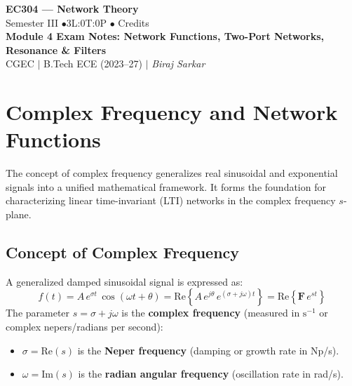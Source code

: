 \documentclass[12pt,a4paper]{article}
\begin{document}
\begin{center}
  {\LARGE\bfseries\color{myred} EC304 --- Network Theory}\\[5pt]
  {\normalsize\color{mydark} Semester III \quad$\bullet$\quad 3L:0T:0P \quad$\bullet$ Credits}\\[3pt]
  {\normalsize\color{myteal}\textbf{Module 4 Exam Notes: Network Functions, Two-Port Networks, Resonance \& Filters}}\\[3pt]
  {\small\color{mydark} CGEC \;$|$\; B.Tech ECE (2023--27) \;$|$\; \textit{Biraj Sarkar}}
\end{center}
\vspace{2pt}\noindent{\color{myred}\rule{\linewidth}{1.5pt}}\vspace{2pt}

\hypersetup{linkcolor=mydark}
\tableofcontents
\hypersetup{linkcolor=myteal}
\newpage

\section{Complex Frequency and Network Functions}

The concept of complex frequency generalizes real sinusoidal and exponential signals into a unified mathematical framework. It forms the foundation for characterizing linear time-invariant (LTI) networks in the complex frequency $s$-plane.

\subsection{Concept of Complex Frequency}

\begin{tcolorbox}[defbox, title={\textbf{Definition of Complex Frequency}}]
A generalized damped sinusoidal signal is expressed as:
\begin{equation}
  f(t) = A\,e^{\sigma t}\,\cos(\omega t + \theta) = \text{Re}\left\{ A\,e^{j\theta}\,e^{(\sigma + j\omega)t} \right\} = \text{Re}\left\{ \mathbf{F}\,e^{st} \right\}
\end{equation}
The parameter $s = \sigma + j\omega$ is the \textbf{complex frequency} (measured in $\text{s}^{-1}$ or complex nepers/radians per second):
\begin{itemize}[leftmargin=*]
  \item $\sigma = \text{Re}(s)$ is the \textbf{Neper frequency} (damping or growth rate in Np/s).
  \item $\omega = \text{Im}(s)$ is the \textbf{radian angular frequency} (oscillation rate in rad/s).
\end{itemize}
\end{tcolorbox}
\end{document}
